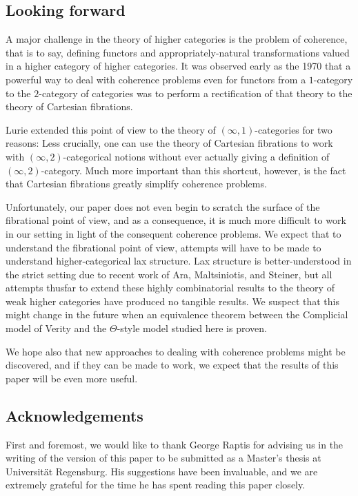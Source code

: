 \documentclass[leqno]{article}
\numberwithin{equation}{subsection}
\theoremstyle{plain}   %
\theoremstyle{remark}
\theoremstyle{plain}
\begin{document}
\subsection*{Looking forward}
A major challenge in the theory of higher categories is the problem of coherence, that is to say, defining functors and appropriately-natural transformations valued in a higher category of higher categories. It was observed early as the 1970 that a powerful way to deal with coherence problems even for functors from a \(1\)-category to the \(2\)-category of categories was to perform a rectification of that theory to the theory of Cartesian fibrations.  

Lurie extended this point of view to the theory of \((\infty,1)\)-categories for two reasons: Less crucially, one can use the theory of Cartesian fibrations to work with \((\infty,2)\)-categorical notions without ever actually giving a definition of \((\infty,2)\)-category.  Much more important than this shortcut, however, is the fact that Cartesian fibrations greatly simplify coherence problems.  

Unfortunately, our paper does not even begin to scratch the surface of the fibrational point of view, and as a consequence, it is much more difficult to work in our setting in light of the consequent coherence problems.  We expect that to understand the fibrational point of view, attempts will have to be made to understand higher-categorical lax structure.  Lax structure is better-understood in the strict setting due to recent work of Ara, Maltsiniotis, and Steiner, but all attempts thusfar to extend these highly combinatorial results to the theory of weak higher categories have produced no tangible results.  We suspect that this might change in the future when an equivalence theorem between the Complicial model of Verity and the \(\Theta\)-style model studied here is proven.

We hope also that new approaches to dealing with coherence problems might be discovered, and if they can be made to work, we expect that the results of this paper will be even more useful.  

\subsection*{Acknowledgements} First and foremost, we would like to thank George Raptis for advising us in the writing of the version of this paper to be submitted as a Master's thesis at Universit\"at Regensburg.  His suggestions have been invaluable, and we are extremely grateful for the time he has spent reading this paper closely.
\end{document}
